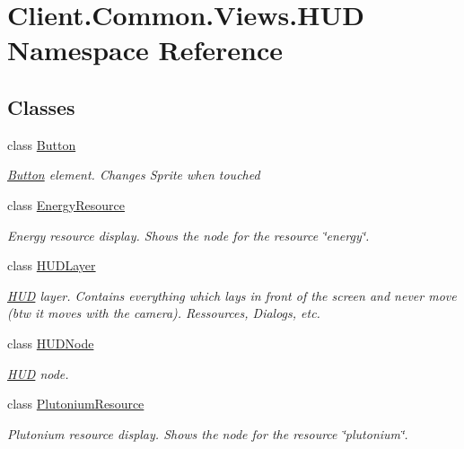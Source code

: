\hypertarget{namespaceClient_1_1Common_1_1Views_1_1HUD}{}\section{Client.\+Common.\+Views.\+H\+U\+D Namespace Reference}
\label{namespaceClient_1_1Common_1_1Views_1_1HUD}
\subsection*{Classes}
\begin{DoxyCompactItemize}
\item 
class \hyperlink{classClient_1_1Common_1_1Views_1_1HUD_1_1Button}{Button}
\begin{DoxyCompactList}\small\item\em \hyperlink{classClient_1_1Common_1_1Views_1_1HUD_1_1Button}{Button} element. Changes Sprite when touched \end{DoxyCompactList}\item 
class \hyperlink{classClient_1_1Common_1_1Views_1_1HUD_1_1EnergyResource}{Energy\+Resource}
\begin{DoxyCompactList}\small\item\em Energy resource display. Shows the node for the resource \char`\"{}energy\char`\"{}. \end{DoxyCompactList}\item 
class \hyperlink{classClient_1_1Common_1_1Views_1_1HUD_1_1HUDLayer}{H\+U\+D\+Layer}
\begin{DoxyCompactList}\small\item\em \hyperlink{namespaceClient_1_1Common_1_1Views_1_1HUD}{H\+U\+D} layer. Contains everything which lays in front of the screen and never move (btw it moves with the camera). Ressources, Dialogs, etc. \end{DoxyCompactList}\item 
class \hyperlink{classClient_1_1Common_1_1Views_1_1HUD_1_1HUDNode}{H\+U\+D\+Node}
\begin{DoxyCompactList}\small\item\em \hyperlink{namespaceClient_1_1Common_1_1Views_1_1HUD}{H\+U\+D} node. \end{DoxyCompactList}\item 
class \hyperlink{classClient_1_1Common_1_1Views_1_1HUD_1_1PlutoniumResource}{Plutonium\+Resource}
\begin{DoxyCompactList}\small\item\em Plutonium resource display. Shows the node for the resource \char`\"{}plutonium\char`\"{}. \end{DoxyCompactList}\item 

\end{DoxyCompactItemize}
